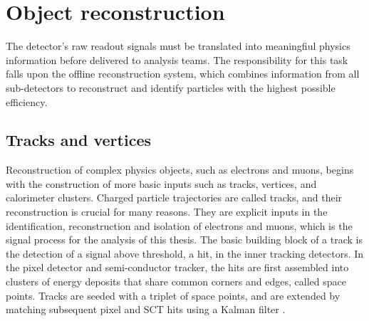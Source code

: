 

\section{Object reconstruction}

The \ATLAS detector's raw readout signals must be translated into meaningfiul physics information before delivered to analysis teams. The responsibility for this task falls upon the offline reconstruction system, which combines information from all sub-detectors to reconstruct and identify particles with the highest possible efficiency. 

\subsection{Tracks and vertices}

Reconstruction of complex physics objects, such as electrons and muons, begins with the construction of more basic inputs such as tracks, vertices, and calorimeter clusters. 
Charged particle trajectories are called tracks, and their reconstruction is crucial for many reasons. They are explicit inputs in the identification, reconstruction and isolation of electrons and muons, which is the signal process for the analysis of this thesis. The basic building block of a track is the detection of a signal above threshold, a hit, in the inner tracking detectors. In the pixel detector and semi-conductor tracker, the hits are first assembled into clusters of energy deposits that share common corners and edges, called space points. Tracks are seeded with a triplet of space points, and are extended by matching subsequent pixel and SCT hits using a Kalman filter \cite{ATLAS-CONF-2012-042}. 

